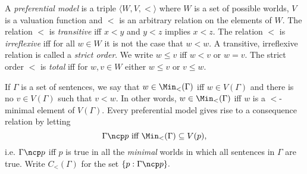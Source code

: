 A {\em preferential model} is a triple $\langle W, V, < \rangle$ where $W$ is a
set of possible worlds, $V$ is a valuation function and $<$ is an arbitrary
relation on the elements of $W$. The relation $<$ is {\em transitive} iff $x<y$
and $y<z$ implies $x<z$. The relation $<$ is {\em irreflexive} iff for all $w\in
W$ it is not the case that $w<w.$ A transitive, irreflexive relation is called a
{\em strict order}. We write $w\leq v$ iff $w<v$ or $w=v$. The strict order $<$
is {\em total} iff for $w,v\in W$ either $w\leq v$ or $v\leq w$.

If $\Gamma$ is a set of sentences, we say that $w\in \Min_<(\Gamma)$ iff $w\in
V(\Gamma)$ and there is no $v \in V(\Gamma)$ such that $v < w$. In other words,
$w\in \Min_<(\Gamma)$ iff $w$ is a $<$-minimal element of $V(\Gamma)$. Every
preferential model gives rise to a consequence relation by letting  $$\Gamma
\ncp p \text{ iff } \Min_<(\Gamma) \subseteq V(p),$$ i.e. $\Gamma \ncp p$ iff
$p$ is true in all the {\em minimal} worlds in which all sentences in $\Gamma$
are true. Write $C_<(\Gamma)$ for the set $\{ p : \Gamma \ncp p \}.$ 

